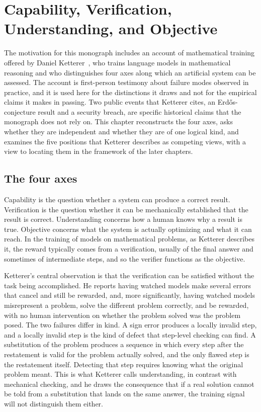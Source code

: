 \chapter{Capability, Verification, Understanding, and Objective}
\label{ch:axes}

The motivation for this monograph includes an account of mathematical training offered by Daniel Ketterer~\cite{Ketterer26}, who trains language models in mathematical reasoning and who distinguishes four axes along which an artificial system can be assessed. The account is first-person testimony about failure modes observed in practice, and it is used here for the distinctions it draws and not for the empirical claims it makes in passing. Two public events that Ketterer cites, an Erdős-conjecture result and a security breach, are specific historical claims that the monograph does not rely on. This chapter reconstructs the four axes, asks whether they are independent and whether they are of one logical kind, and examines the five positions that Ketterer describes as competing views, with a view to locating them in the framework of the later chapters.

\section{The four axes}

Capability is the question whether a system can produce a correct result. Verification is the question whether it can be mechanically established that the result is correct. Understanding concerns how a human knows why a result is true. Objective concerns what the system is actually optimizing and what it can reach. In the training of models on mathematical problems, as Ketterer describes it, the reward typically comes from a verification, usually of the final answer and sometimes of intermediate steps, and so the verifier functions as the objective.

Ketterer's central observation is that the verification can be satisfied without the task being accomplished. He reports having watched models make several errors that cancel and still be rewarded, and, more significantly, having watched models misrepresent a problem, solve the different problem correctly, and be rewarded, with no human intervention on whether the problem solved was the problem posed. The two failures differ in kind. A sign error produces a locally invalid step, and a locally invalid step is the kind of defect that step-level checking can find. A substitution of the problem produces a sequence in which every step after the restatement is valid for the problem actually solved, and the only flawed step is the restatement itself. Detecting that step requires knowing what the original problem meant. This is what Ketterer calls understanding, in contrast with mechanical checking, and he draws the consequence that if a real solution cannot be told from a substitution that lands on the same answer, the training signal will not distinguish them either.

